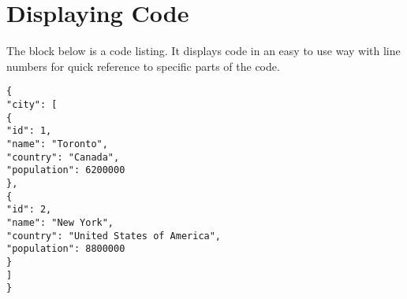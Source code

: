 

\section{Displaying Code}

The block below is a code listing. It displays code in an easy to use way with line numbers for quick reference to specific parts of the code.

\begin{lstlisting}
{
"city": [
{
"id": 1,
"name": "Toronto",
"country": "Canada",
"population": 6200000
},
{
"id": 2,
"name": "New York",
"country": "United States of America",
"population": 8800000
}
]
}
\end{lstlisting}
